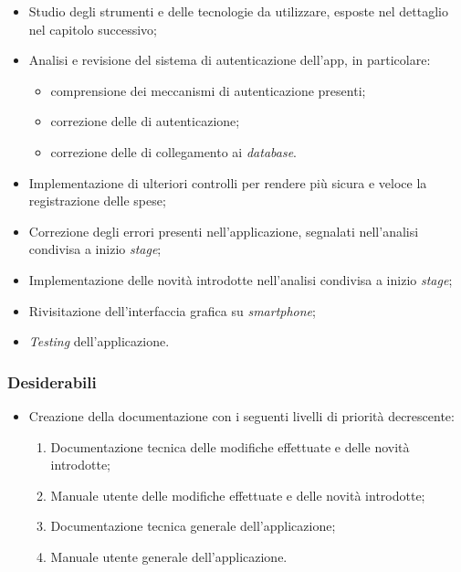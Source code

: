 \begin{itemize}
    \item Studio degli strumenti e delle tecnologie da utilizzare, esposte nel dettaglio nel capitolo successivo;
    \item Analisi e revisione del sistema di autenticazione dell'app, in particolare:
    \begin{itemize}
        \item comprensione dei meccanismi di autenticazione presenti;
        \item correzione delle  di autenticazione;
        \item correzione delle  di collegamento ai \textit{database}.
    \end{itemize}
    \item Implementazione di ulteriori controlli per rendere più sicura e veloce la registrazione delle spese;
    \item Correzione degli errori presenti nell'applicazione, segnalati nell'analisi condivisa a inizio \textit{stage};
    \item Implementazione delle novità introdotte nell'analisi condivisa a inizio \textit{stage};
    \item Rivisitazione dell'interfaccia grafica su \textit{smartphone};
    \item \textit{Testing} dell'applicazione.
\end{itemize}

\subsubsection{Desiderabili}

\begin{itemize}
    \item Creazione della documentazione con i seguenti livelli di priorità decrescente:
    \begin{enumerate}
        \item Documentazione tecnica delle modifiche effettuate e delle novità introdotte;
        \item Manuale utente delle modifiche effettuate e delle novità introdotte;
        \item Documentazione tecnica generale dell'applicazione;
        \item Manuale utente generale dell'applicazione.
    \end{enumerate}
\end{itemize}


